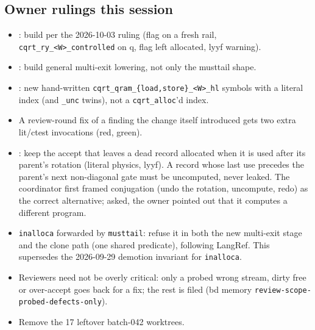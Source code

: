\subsection*{Owner rulings this session}
\begin{itemize}
  \item {}: build per the 2026-10-03 ruling (flag on a fresh rail,
  \texttt{cqrt\_ry\_<W>\_controlled} on q, flag left allocated, lyyf warning).
  \item {}: build general multi-exit lowering, not only the musttail shape.
  \item {}: new hand-written \texttt{cqrt\_qram\_\{load,store\}\_<W>\_hl}
  symbols with a literal index (and \texttt{\_unc} twins), not a \texttt{cqrt\_alloc}'d index.
  \item A review-round fix of a finding the change itself introduced gets two extra
  lit/ctest invocations (red, green).
  \item {}: keep the accept that leaves a dead record allocated when it is used
  after its parent's rotation (literal physics, lyyf). A record whose last use precedes
  the parent's next non-diagonal gate must be uncomputed, never leaked. The coordinator
  first framed conjugation (undo the rotation, uncompute, redo) as the correct
  alternative; asked, the owner pointed out that it computes a different program.
  \item \texttt{inalloca} forwarded by \texttt{musttail}: refuse it in both the new
  multi-exit stage and the clone path (one shared predicate), following LangRef. This
  supersedes the 2026-09-29 demotion invariant for \texttt{inalloca}.
  \item Reviewers need not be overly critical: only a probed wrong stream, dirty free or
  over-accept goes back for a fix; the rest is filed (bd memory
  \texttt{review-scope-probed-defects-only}).
  \item Remove the 17 leftover batch-042 worktrees.
\end{itemize}

